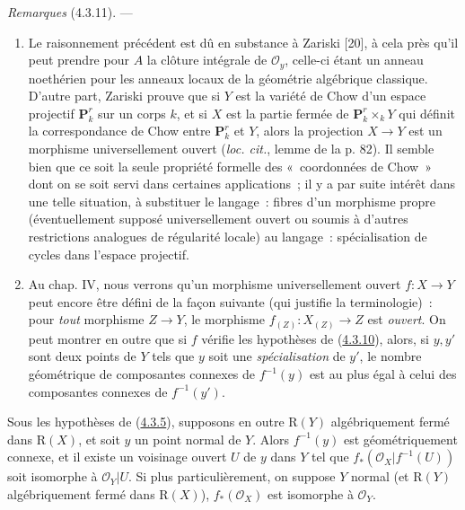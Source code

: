 \begin{env}[4.3.11]
\label{III.4.3.11-fr}
\emph{Remarques} (4.3.11). ---
\begin{enumerate}
\item[(i)] Le raisonnement précédent est dû en substance à Zariski [20], à
cela près qu'il peut prendre pour $A$ la clôture intégrale de
$\mathcal O_y$, celle-ci étant un anneau noethérien pour les anneaux locaux
de la géométrie algébrique classique. D'autre part, Zariski prouve que si
$Y$ est la variété de Chow d'un espace projectif $\mathbf P_k^r$ sur un
corps $k$, et si $X$ est la partie fermée de $\mathbf P_k^r\times_kY$ qui
définit la correspondance de Chow entre $\mathbf P_k^r$ et $Y$, alors la
projection $X\to Y$ est un morphisme universellement ouvert
(\emph{loc. cit.}, lemme de la p. 82). Il semble bien que ce soit la seule
propriété formelle des «~coordonnées de Chow~» dont on se soit servi dans
certaines applications~; il y a par suite intérêt dans une telle situation,
à substituer le langage~: fibres d'un morphisme propre (éventuellement
supposé universellement ouvert ou soumis à d'autres restrictions analogues
de régularité locale) au langage~: spécialisation de cycles dans l'espace
projectif.

\item[(ii)] Au chap. IV, nous verrons qu'un morphisme universellement ouvert
$f:X\to Y$ peut encore être défini de la façon suivante (qui justifie la
terminologie)~: pour \emph{tout} morphisme $Z\to Y$, le morphisme
$f_{(Z)}:X_{(Z)}\to Z$ est \emph{ouvert}. On peut montrer en outre que si $f$
vérifie les hypothèses de (\hyperref[III.4.3.10-fr]{4.3.10}), alors, si
$y,y'$ sont deux points de $Y$ tels que $y$ soit une \emph{spécialisation} de $y'$,
le nombre géométrique de composantes connexes de $f^{-1}(y)$ est au plus
égal à celui des composantes connexes de $f^{-1}(y')$.
\end{enumerate}
\end{env}

\begin{corollary}[4.3.12]
\label{III.4.3.12-fr}
Sous les hypothèses de \textup{(\hyperref[III.4.3.5-fr]{4.3.5})}, supposons en outre
$\mathrm R(Y)$ algébriquement fermé dans $\mathrm R(X)$, et soit $y$ un
point normal de $Y$. Alors $f^{-1}(y)$ est géométriquement connexe, et il
existe un voisinage ouvert $U$ de $y$ dans $Y$ tel que
$f_*(\mathcal O_X|f^{-1}(U))$ soit isomorphe à $\mathcal O_Y|U$. Si plus
particulièrement, on suppose $Y$ normal (et $\mathrm R(Y)$ algébriquement
fermé dans $\mathrm R(X)$), $f_*(\mathcal O_X)$ est isomorphe à
$\mathcal O_Y$.
\end{corollary}

